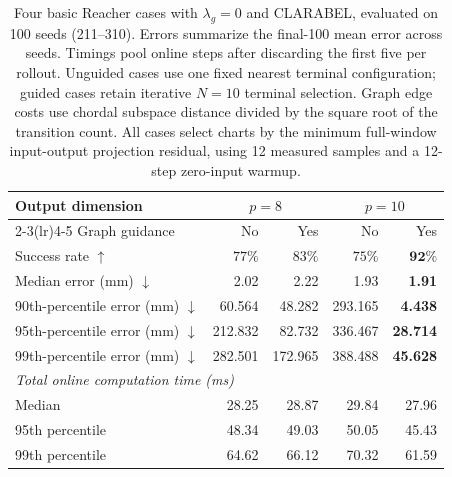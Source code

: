 \documentclass[10pt]{article}
\begin{document}
\begin{table}[htbp]
\centering
\small
\begin{tabular}{lrrrr}
\toprule
Output dimension & \multicolumn{2}{c}{$p=8$} & \multicolumn{2}{c}{$p=10$} \\
\cmidrule(lr){2-3}\cmidrule(lr){4-5}
Graph guidance & No & Yes & No & Yes \\
\midrule
Success rate $\uparrow$ & $77\%$ & $83\%$ & $75\%$ & $\mathbf{92\%}$ \\
Median error (mm) $\downarrow$ & 2.02 & 2.22 & 1.93 & \textbf{1.91} \\
90th-percentile error (mm) $\downarrow$ & 60.564 & 48.282 & 293.165 & \textbf{4.438} \\
95th-percentile error (mm) $\downarrow$ & 212.832 & 82.732 & 336.467 & \textbf{28.714} \\
99th-percentile error (mm) $\downarrow$ & 282.501 & 172.965 & 388.488 & \textbf{45.628} \\
\midrule
\multicolumn{5}{l}{\textit{Total online computation time (ms)}} \\
Median & 28.25 & 28.87 & 29.84 & 27.96 \\
95th percentile & 48.34 & 49.03 & 50.05 & 45.43 \\
99th percentile & 64.62 & 66.12 & 70.32 & 61.59 \\
\bottomrule
\end{tabular}
\caption{Four basic Reacher cases with $\lambda_g=0$ and CLARABEL, evaluated on 100 seeds (211--310). Errors summarize the final-100 mean error across seeds. Timings pool online steps after discarding the first five per rollout. Unguided cases use one fixed nearest terminal configuration; guided cases retain iterative $N=10$ terminal selection. Graph edge costs use chordal subspace distance divided by the square root of the transition count. All cases select charts by the minimum full-window input-output projection residual, using 12 measured samples and a 12-step zero-input warmup.}
\label{tab:basic-cases-clarabel-lamg0}
\end{table}
\end{document}
